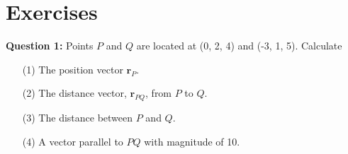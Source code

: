 \documentclass[12pt,a4paper]{article}
\begin{document}
\section{Exercises}
\noindent\textbf{Question 1:} Points $P$ and $Q$ are located at (0, 2, 4) and (-3, 1, 5). Calculate
\begin{enumerate}
\item[(1)] The position vector $\textbf{r}_P$.
\item[(2)] The distance vector, $\textbf{r}_{PQ}$, from $P$ to $Q$.
\item[(3)] The distance between $P$ and $Q$.
\item[(4)] A vector parallel to $PQ$ with magnitude of 10.
\end{enumerate}



\end{document}
